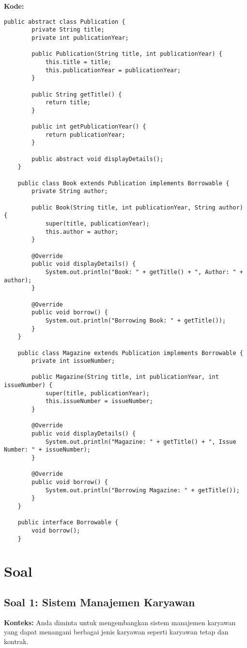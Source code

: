 \textbf{Kode:}

\begin{lstlisting}[style=JavaStyle]
	public abstract class Publication {
		private String title;
		private int publicationYear;
		
		public Publication(String title, int publicationYear) {
			this.title = title;
			this.publicationYear = publicationYear;
		}
		
		public String getTitle() {
			return title;
		}
		
		public int getPublicationYear() {
			return publicationYear;
		}
		
		public abstract void displayDetails();
	}
	
	public class Book extends Publication implements Borrowable {
		private String author;
		
		public Book(String title, int publicationYear, String author) {
			super(title, publicationYear);
			this.author = author;
		}
		
		@Override
		public void displayDetails() {
			System.out.println("Book: " + getTitle() + ", Author: " + author);
		}
		
		@Override
		public void borrow() {
			System.out.println("Borrowing Book: " + getTitle());
		}
	}
	
	public class Magazine extends Publication implements Borrowable {
		private int issueNumber;
		
		public Magazine(String title, int publicationYear, int issueNumber) {
			super(title, publicationYear);
			this.issueNumber = issueNumber;
		}
		
		@Override
		public void displayDetails() {
			System.out.println("Magazine: " + getTitle() + ", Issue Number: " + issueNumber);
		}
		
		@Override
		public void borrow() {
			System.out.println("Borrowing Magazine: " + getTitle());
		}
	}
	
	public interface Borrowable {
		void borrow();
	}
\end{lstlisting}


\section{Soal}

\subsection{Soal 1: Sistem Manajemen Karyawan}

\textbf{Konteks:} Anda diminta untuk mengembangkan sistem manajemen karyawan yang dapat menangani berbagai jenis karyawan seperti karyawan tetap dan kontrak.

